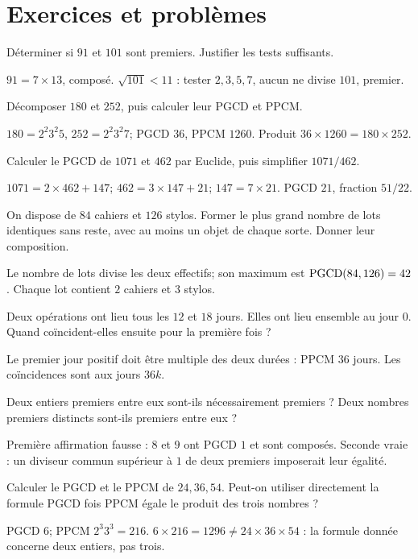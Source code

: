 \section{Exercices et problèmes}
\label{t11s-c10-e01}
Déterminer si $91$ et $101$ sont premiers. Justifier les tests suffisants.
\begin{corrige}\label{sol-t11s-c10-e01}
$91=7\times13$, composé. $\sqrt{101}<11$ : tester $2,3,5,7$, aucun ne divise $101$, premier.
\end{corrige}
\exo[Décompositions]\label{t11s-c10-e02}
Décomposer $180$ et $252$, puis calculer leur PGCD et PPCM.
\begin{corrige}\label{sol-t11s-c10-e02}
$180=2^2 3^2 5$, $252=2^2 3^2 7$; PGCD $36$, PPCM $1260$. Produit $36\times1260=180\times252$.
\end{corrige}
\exo[Euclide]\label{t11s-c10-e03}
Calculer le PGCD de $1071$ et $462$ par Euclide, puis simplifier $1071/462$.
\begin{corrige}\label{sol-t11s-c10-e03}
$1071=2\times462+147$; $462=3\times147+21$; $147=7\times21$. PGCD $21$, fraction $51/22$.
\end{corrige}
\label{t11s-c10-e04}
On dispose de $84$ cahiers et $126$ stylos. Former le plus grand nombre de lots identiques sans reste, avec au moins un objet de chaque sorte. Donner leur composition.
\begin{corrige}\label{sol-t11s-c10-e04}
Le nombre de lots divise les deux effectifs; son maximum est $\operatorname{PGCD}(84,126)=42$. Chaque lot contient $2$ cahiers et $3$ stylos.
\end{corrige}
\label{t11s-c10-e05}
Deux opérations ont lieu tous les $12$ et $18$ jours. Elles ont lieu ensemble au jour $0$. Quand coïncident-elles ensuite pour la première fois ?
\begin{corrige}\label{sol-t11s-c10-e05}
Le premier jour positif doit être multiple des deux durées : PPCM $36$ jours. Les coïncidences sont aux jours $36k$.
\end{corrige}
\label{t11s-c10-e06}
Deux entiers premiers entre eux sont-ils nécessairement premiers ? Deux nombres premiers distincts sont-ils premiers entre eux ?
\begin{corrige}\label{sol-t11s-c10-e06}
Première affirmation fausse : $8$ et $9$ ont PGCD $1$ et sont composés. Seconde vraie : un diviseur commun supérieur à $1$ de deux premiers imposerait leur égalité.
\end{corrige}
\label{t11s-c10-e07}
Calculer le PGCD et le PPCM de $24,36,54$. Peut-on utiliser directement la formule PGCD fois PPCM égale le produit des trois nombres ?
\begin{corrige}\label{sol-t11s-c10-e07}
PGCD $6$; PPCM $2^3 3^3=216$. $6\times216=1296\ne24\times36\times54$ : la formule donnée concerne deux entiers, pas trois.
\end{corrige}

